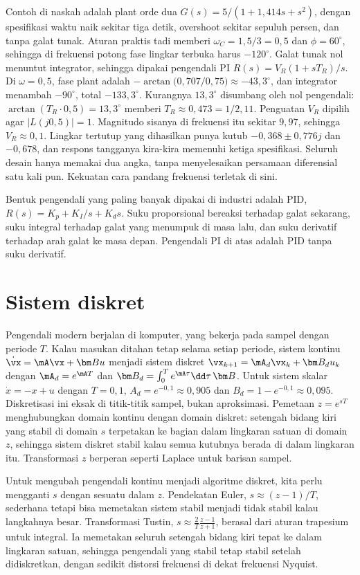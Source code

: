 Contoh di naskah adalah plant orde dua $G(s)=5/(1+1{,}414s+s^2)$, dengan spesifikasi waktu naik sekitar tiga detik, overshoot
sekitar sepuluh persen, dan tanpa galat tunak. Aturan praktis tadi memberi $\omega_C=1{,}5/3=0{,}5$ dan $\phi=60^\circ$, sehingga di
frekuensi potong fase lingkar terbuka harus $-120^\circ$. Galat tunak nol menuntut integrator, sehingga dipakai pengendali PI
$R(s)=V_R(1+sT_R)/s$. Di $\omega=0{,}5$, fase plant adalah $-\arctan\big(0{,}707/0{,}75\big)\approx-43{,}3^\circ$, dan integrator
menambah $-90^\circ$, total $-133{,}3^\circ$. Kurangnya $13{,}3^\circ$ disumbang oleh nol pengendali:
$\arctan(T_R\cdot0{,}5)=13{,}3^\circ$ memberi $T_R\approx0{,}473=1/2{,}11$. Penguatan $V_R$ dipilih agar $|L(j0{,}5)|=1$. Magnitudo
sisanya di frekuensi itu sekitar $9{,}97$, sehingga $V_R\approx0{,}1$. Lingkar tertutup yang dihasilkan punya kutub
$-0{,}368\pm0{,}776j$ dan $-0{,}678$, dan respons tangganya kira-kira memenuhi ketiga spesifikasi. Seluruh desain hanya memakai
dua angka, tanpa menyelesaikan persamaan diferensial satu kali pun. Kekuatan cara pandang frekuensi terletak di sini.

Bentuk pengendali yang paling banyak dipakai di industri adalah PID, $R(s)=K_p+K_I/s+K_ds$. Suku proporsional bereaksi terhadap galat
sekarang, suku integral terhadap galat yang menumpuk di masa lalu, dan suku derivatif terhadap arah galat ke masa depan. Pengendali
PI di atas adalah PID tanpa suku derivatif.

\section{Sistem diskret}

Pengendali modern berjalan di komputer, yang bekerja pada sampel dengan periode $T$. Kalau masukan ditahan tetap selama setiap periode, sistem kontinu $\dot\vx=\mA\vx+\bm Bu$ menjadi sistem
diskret $\vx_{k+1}=\mA_d\vx_k+\bm B_du_k$ dengan $\mA_d=e^{\mA T}$ dan $\bm B_d=\int_0^Te^{\mA\tau}\dd\tau\,\bm B$. Untuk sistem skalar
$\dot x=-x+u$ dengan $T=0{,}1$, $A_d=e^{-0{,}1}\approx0{,}905$ dan $B_d=1-e^{-0{,}1}\approx0{,}095$. Diskretisasi ini eksak di titik-titik
sampel, bukan aproksimasi. Pemetaan $z=e^{sT}$
menghubungkan domain kontinu dengan domain diskret: setengah bidang kiri yang stabil di domain $s$ terpetakan
ke bagian dalam lingkaran satuan di domain $z$, sehingga sistem diskret stabil kalau semua kutubnya berada di
dalam lingkaran itu. Transformasi $z$ berperan seperti Laplace untuk barisan sampel.

Untuk mengubah pengendali kontinu menjadi algoritme diskret, kita perlu mengganti $s$ dengan sesuatu dalam $z$.
Pendekatan Euler, $s\approx(z-1)/T$, sederhana tetapi bisa memetakan sistem stabil menjadi tidak stabil kalau
langkahnya besar. Transformasi Tustin, $s\approx\frac2T\frac{z-1}{z+1}$, berasal dari aturan trapesium untuk
integral. Ia memetakan seluruh setengah bidang kiri tepat ke dalam lingkaran satuan, sehingga pengendali yang
stabil tetap stabil setelah didiskretkan, dengan sedikit distorsi frekuensi di dekat frekuensi Nyquist.

